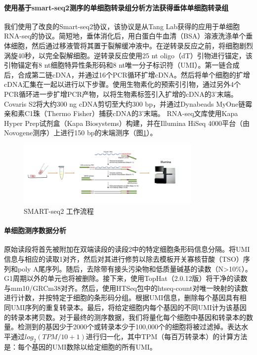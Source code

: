 \documentclass[class = opening]{whuthesis}
\begin{document}
\paragraph{使用基于smart-seq2测序的单细胞转录组分析方法获得垂体单细胞转录组}
  我们使用了改良的Smart-seq2协议，该协议是从Tang Lab获得的应用于单细胞RNA-seq的协议。简短地，垂体消化后，用白蛋白牛血清（BSA）溶液洗涤单个垂体细胞，然后通过移液管将其置于裂解缓冲液中。在逆转录反应之前，将细胞剧烈涡旋40秒，以完全裂解细胞。逆转录反应使用25 nt oligo（dT）引物进行锚定，该引物锚定有8 nt细胞特异性条形码和8 nt唯一分子标识符（UMI）。第一链合成后，合成第二链cDNA，并通过16个PCR循环扩增cDNA。然后将单个细胞的扩增cDNA汇集在一起​​以进行以下步骤。使用生物素化的预索引引物，通过另外4个PCR循环进一步扩增PCR产物，以将生物素标签引入扩增的cDNA的3'末端。 Covaris S2将大约300 ng cDNA剪切至大约300 bp，并通过Dynabeads MyOne链霉亲和素C1珠（Thermo Fisher）捕获cDNA的3'末端。 RNA-seq文库使用Kapa Hyper Prep试剂盒（Kapa Biosystems）构建，并在Illumina HiSeq 4000平台（由Novogene测序）上进行150 bp的末端测序（图\ref{fig:scseq-smart}）。
\begin{figure}[!htb]
  \centering
  \includegraphics[width=0.8\textwidth]{figs/scseq-smart.png}
  \caption{SMART-seq2 工作流程}
  \label{fig:scseq-smart}
\end{figure}
\paragraph{单细胞测序数据分析}
  原始读段将首先被附加在双端读段的读段2中的特定细胞条形码信息分隔。将UMI信息与相应的读取1对齐，然后对其进行修剪以除去模板开关寡核苷酸（TSO）序列和poly A尾序列。随后，去除带有接头污染物和低质量碱基的读数（N>10\%）。 G1周期以外的单元也将被删除。接下来，使用TopHat（2.0.12版）将干净的读数与mm10/GRCm38对齐。然后，使用HTSeq包中的htseq-count对唯一映射的读数进行计数，并按特定于细胞的条形码分组。根据UMI信息，删除每个基因具有相同UMI序列的重复转录本。最后，将给定细胞内每个基因的不同UMI计为该基因的转录本拷贝数。对于最终的测序数据，我们将量化每个细胞中基因和转录本的数量。检测到的基因少于2000个或转录本少于100,000个的细胞将被过滤掉。表达水平通过$log_{2}(TPM/10+1)$进行归一化，其中TPM（每百万转录本）的计算方法是：每个基因的UMI数除以给定细胞的所有UMI。
\end{document}
